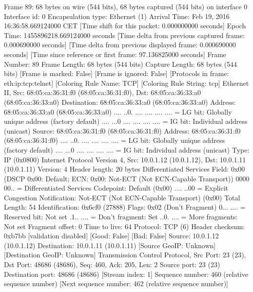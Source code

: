 Frame 89: 68 bytes on wire (544 bits), 68 bytes captured (544 bits) on interface 0
    Interface id: 0
    Encapsulation type: Ethernet (1)
    Arrival Time: Feb 19, 2016 16:36:58.669124000 CET
    [Time shift for this packet: 0.000000000 seconds]
    Epoch Time: 1455896218.669124000 seconds
    [Time delta from previous captured frame: 0.000690000 seconds]
    [Time delta from previous displayed frame: 0.000690000 seconds]
    [Time since reference or first frame: 97.136825000 seconds]
    Frame Number: 89
    Frame Length: 68 bytes (544 bits)
    Capture Length: 68 bytes (544 bits)
    [Frame is marked: False]
    [Frame is ignored: False]
    [Protocols in frame: eth:ip:tcp:telnet]
    [Coloring Rule Name: TCP]
    [Coloring Rule String: tcp]
Ethernet II, Src: 68:05:ca:36:31:f0 (68:05:ca:36:31:f0), Dst: 68:05:ca:36:33:a0 (68:05:ca:36:33:a0)
    Destination: 68:05:ca:36:33:a0 (68:05:ca:36:33:a0)
        Address: 68:05:ca:36:33:a0 (68:05:ca:36:33:a0)
        .... ..0. .... .... .... .... = LG bit: Globally unique address (factory default)
        .... ...0 .... .... .... .... = IG bit: Individual address (unicast)
    Source: 68:05:ca:36:31:f0 (68:05:ca:36:31:f0)
        Address: 68:05:ca:36:31:f0 (68:05:ca:36:31:f0)
        .... ..0. .... .... .... .... = LG bit: Globally unique address (factory default)
        .... ...0 .... .... .... .... = IG bit: Individual address (unicast)
    Type: IP (0x0800)
Internet Protocol Version 4, Src: 10.0.1.12 (10.0.1.12), Dst: 10.0.1.11 (10.0.1.11)
    Version: 4
    Header length: 20 bytes
    Differentiated Services Field: 0x00 (DSCP 0x00: Default; ECN: 0x00: Not-ECT (Not ECN-Capable Transport))
        0000 00.. = Differentiated Services Codepoint: Default (0x00)
        .... ..00 = Explicit Congestion Notification: Not-ECT (Not ECN-Capable Transport) (0x00)
    Total Length: 54
    Identification: 0x6cf0 (27888)
    Flags: 0x02 (Don't Fragment)
        0... .... = Reserved bit: Not set
        .1.. .... = Don't fragment: Set
        ..0. .... = More fragments: Not set
    Fragment offset: 0
    Time to live: 64
    Protocol: TCP (6)
    Header checksum: 0xb7bb [validation disabled]
        [Good: False]
        [Bad: False]
    Source: 10.0.1.12 (10.0.1.12)
    Destination: 10.0.1.11 (10.0.1.11)
    [Source GeoIP: Unknown]
    [Destination GeoIP: Unknown]
Transmission Control Protocol, Src Port: 23 (23), Dst Port: 48686 (48686), Seq: 460, Ack: 205, Len: 2
    Source port: 23 (23)
    Destination port: 48686 (48686)
    [Stream index: 1]
    Sequence number: 460    (relative sequence number)
    [Next sequence number: 462    (relative sequence number)]
